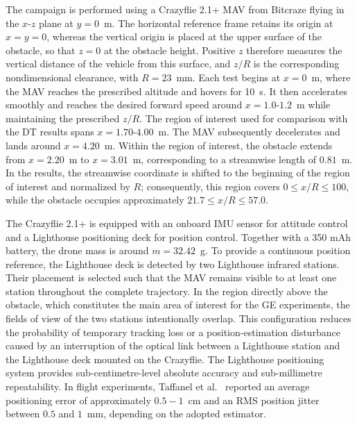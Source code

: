 \documentclass[journal]{IEEEtran}
\begin{document}
The campaign is performed using a Crazyflie 2.1+ MAV from Bitcraze flying in the $x$-$z$ plane at $y=0$~m. The horizontal reference frame retains its origin at $x=y=0$, whereas the vertical origin is placed at the upper surface of the obstacle, so that $z=0$ at the obstacle height. Positive $z$ therefore measures the vertical distance of the vehicle from this surface, and $z/R$ is the corresponding nondimensional clearance, with $R=23$~mm. Each test begins at $x=0$~m, where the MAV reaches the prescribed altitude and hovers for 10~s. It then accelerates smoothly and reaches the desired forward speed around $x=1.0$-$1.2$~m while maintaining the prescribed $z/R$. The region of interest used for comparison with the DT results spans $x=1.70$-$4.00$~m. The MAV subsequently decelerates and lands around $x=4.20$~m. Within the region of interest, the obstacle extends from $x=2.20$~m to $x=3.01$~m, corresponding to a streamwise length of $0.81$~m. In the results, the streamwise coordinate is shifted to the beginning of the region of interest and normalized by $R$; consequently, this region covers $0\leq x/R\leq100$, while the obstacle occupies approximately $21.7\leq x/R\leq57.0$.

The Crazyflie 2.1+ is equipped with an onboard IMU sensor for attitude control and a Lighthouse positioning deck for position control. Together with a 350 mAh battery, the drone mass is around $m=32.42$~g. To provide a continuous position reference, the Lighthouse deck is detected by two Lighthouse infrared stations. Their placement is selected such that the MAV remains visible to at least one station throughout the complete trajectory. In the region directly above the obstacle, which constitutes the main area of interest for the GE experiments, the fields of view of the two stations intentionally overlap. This configuration reduces the probability of temporary tracking loss or a position-estimation disturbance caused by an interruption of the optical link between a Lighthouse station and the Lighthouse deck mounted on the Crazyflie. The Lighthouse positioning system provides sub-centimetre-level absolute accuracy and sub-millimetre repeatability. In flight experiments, Taffanel et al.~\cite{Taffanel2021Lighthouse} reported an average positioning error of approximately $0.5-1$~cm and an RMS position jitter between $0.5$ and $1$~mm, depending on the adopted estimator. 
\end{document}

